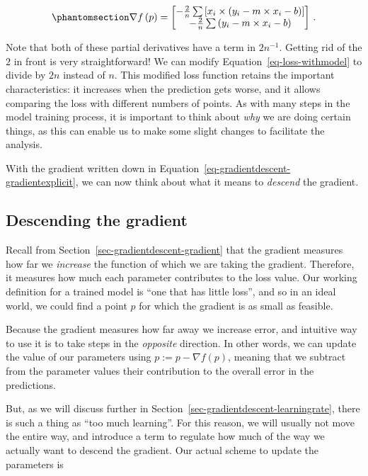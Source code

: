 \documentclass[
  letterpaper,
]{scrbook}
\begin{document}
\begin{equation}\phantomsection\label{eq-gradientdescent-gradientexplicit}{
\nabla f\left(
p
\right) = 
\begin{bmatrix}
-\frac{2}{n}\sum \left[x_i \times (y_i - m\times x_i - b)\right] \\
-\frac{2}{n}\sum \left(y_i - m\times x_i - b\right)
\end{bmatrix}\,.
}\end{equation}

Note that both of these partial derivatives have a term in \(2n^{-1}\).
Getting rid of the \(2\) in front is very straightforward! We can modify
Equation~\ref{eq-loss-withmodel} to divide by \(2n\) instead of \(n\).
This modified loss function retains the important characteristics: it
increases when the prediction gets worse, and it allows comparing the
loss with different numbers of points. As with many steps in the model
training process, it is important to think about \emph{why} we are doing
certain things, as this can enable us to make some slight changes to
facilitate the analysis.

With the gradient written down in
Equation~\ref{eq-gradientdescent-gradientexplicit}, we can now think
about what it means to \emph{descend} the gradient.

\subsection{Descending the gradient}\label{descending-the-gradient}

Recall from Section~\ref{sec-gradientdescent-gradient} that the gradient
measures how far we \emph{increase} the function of which we are taking
the gradient. Therefore, it measures how much each parameter contributes
to the loss value. Our working definition for a trained model is ``one
that has little loss'', and so in an ideal world, we could find a point
\(p\) for which the gradient is as small as feasible.

Because the gradient measures how far away we increase error, and
intuitive way to use it is to take steps in the \emph{opposite}
direction. In other words, we can update the value of our parameters
using \(p := p - \nabla f(p)\), meaning that we subtract from the
parameter values their contribution to the overall error in the
predictions.

But, as we will discuss further in
Section~\ref{sec-gradientdescent-learningrate}, there is such a thing as
``too much learning''. For this reason, we will usually not move the
entire way, and introduce a term to regulate how much of the way we
actually want to descend the gradient. Our actual scheme to update the
parameters is
\end{document}
